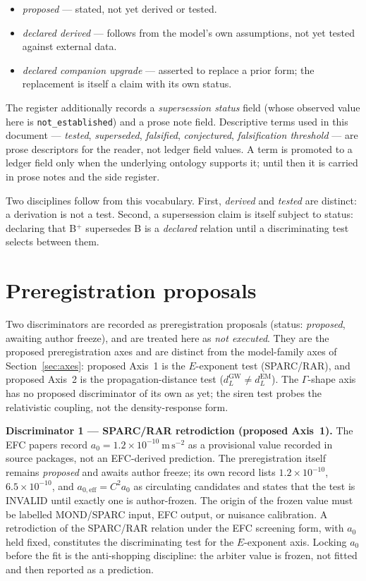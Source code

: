 \documentclass[11pt,a4paper]{article}
\begin{document}
\begin{itemize}
\item \emph{proposed} --- stated, not yet derived or tested.
\item \emph{declared derived} --- follows from the model's own assumptions, not yet tested against external data.
\item \emph{declared companion upgrade} --- asserted to replace a prior form; the replacement is itself a claim with its own status.
\end{itemize}

The register additionally records a \emph{supersession status} field (whose observed value here is \texttt{not\_established}) and a prose note field. Descriptive terms used in this document --- \emph{tested}, \emph{superseded}, \emph{falsified}, \emph{conjectured}, \emph{falsification threshold} --- are prose descriptors for the reader, not ledger field values. A term is promoted to a ledger field only when the underlying ontology supports it; until then it is carried in prose notes and the side register.

Two disciplines follow from this vocabulary. First, \emph{derived} and \emph{tested} are distinct: a derivation is not a test. Second, a supersession claim is itself subject to status: declaring that B$^{+}$ supersedes B is a \emph{declared} relation until a discriminating test selects between them.

\section{Preregistration proposals}
\label{sec:discriminators}

Two discriminators are recorded as preregistration proposals (status: \emph{proposed}, awaiting author freeze), and are treated here as \emph{not executed}. They are the proposed preregistration axes and are distinct from the model-family axes of Section~\ref{sec:axes}: proposed Axis~1 is the $E$-exponent test (SPARC/RAR), and proposed Axis~2 is the propagation-distance test ($d_{L}^{\mathrm{GW}} \neq d_{L}^{\mathrm{EM}}$). The $\Gamma$-shape axis has no proposed discriminator of its own as yet; the siren test probes the relativistic coupling, not the density-response form.

\textbf{Discriminator 1 --- SPARC/RAR retrodiction (proposed Axis~1).} The EFC papers record $a_{0} = 1.2 \times 10^{-10}\ \mathrm{m\,s^{-2}}$ as a provisional value recorded in source packages, not an EFC-derived prediction. The preregistration itself remains \emph{proposed} and awaits author freeze; its own record lists $1.2\times10^{-10}$, $6.5\times10^{-10}$, and $a_{0,\mathrm{eff}} = C^{2}a_{0}$ as circulating candidates and states that the test is INVALID until exactly one is author-frozen. The origin of the frozen value must be labelled MOND/SPARC input, EFC output, or nuisance calibration. A retrodiction of the SPARC/RAR relation under the EFC screening form, with $a_{0}$ held fixed, constitutes the discriminating test for the $E$-exponent axis. Locking $a_{0}$ before the fit is the anti-shopping discipline: the arbiter value is frozen, not fitted and then reported as a prediction.
\end{document}
